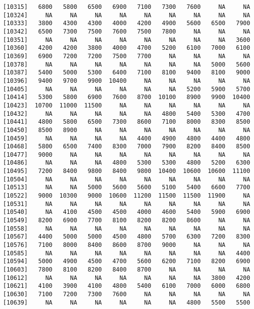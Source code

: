 \documentclass[]{article}
\begin{document}
\begin{verbatim}
[10315]   6800   5800   6500   6900   7100   7300   7600     NA     NA
[10324]     NA     NA     NA     NA     NA     NA     NA     NA     NA
[10333]   3800   4300   4300   4000   4200   4900   5600   6500   7900
[10342]   6500   7300   7500   7600   7500   7800     NA     NA     NA
[10351]     NA     NA     NA     NA     NA     NA     NA     NA   3600
[10360]   4200   4200   3800   4000   4700   5200   6100   7000   6100
[10369]   6900   7200   7200   7500   7700     NA     NA     NA     NA
[10378]     NA     NA     NA     NA     NA     NA     NA   5000   5600
[10387]   5400   5000   5300   6400   7100   8100   9400   8100   9000
[10396]   9400   9700   9900  10400     NA     NA     NA     NA     NA
[10405]     NA     NA     NA     NA     NA     NA   5200   5900   5700
[10414]   5300   5800   6900   7600   8700  10100   8900   9900  10400
[10423]  10700  11000  11500     NA     NA     NA     NA     NA     NA
[10432]     NA     NA     NA     NA     NA   4800   5400   5300   4700
[10441]   4800   5800   6500   7300   8600   7100   8000   8300   8500
[10450]   8500   8900     NA     NA     NA     NA     NA     NA     NA
[10459]     NA     NA     NA     NA   4400   4900   4800   4400   4800
[10468]   5800   6500   7400   8300   7000   7900   8200   8400   8500
[10477]   9000     NA     NA     NA     NA     NA     NA     NA     NA
[10486]     NA     NA     NA   4800   5300   5300   4800   5200   6300
[10495]   7200   8400   9800   8400   9800  10400  10600  10600  11100
[10504]     NA     NA     NA     NA     NA     NA     NA     NA     NA
[10513]     NA     NA   5000   5600   5600   5100   5400   6600   7700
[10522]   9000  10300   9000  10600  11200  11500  11500  11900     NA
[10531]     NA     NA     NA     NA     NA     NA     NA     NA     NA
[10540]     NA   4100   4500   4500   4000   4600   5400   5900   6900
[10549]   8200   6900   7700   8100   8200   8200   8600     NA     NA
[10558]     NA     NA     NA     NA     NA     NA     NA     NA     NA
[10567]   4400   5000   5000   4500   4800   5700   6300   7200   8300
[10576]   7100   8000   8400   8600   8700   9000     NA     NA     NA
[10585]     NA     NA     NA     NA     NA     NA     NA     NA   4400
[10594]   5000   4900   4500   4700   5600   6200   7100   8200   6900
[10603]   7800   8100   8200   8400   8700     NA     NA     NA     NA
[10612]     NA     NA     NA     NA     NA     NA     NA   3800   4200
[10621]   4100   3900   4100   4800   5400   6100   7000   6000   6800
[10630]   7100   7200   7300   7600     NA     NA     NA     NA     NA
[10639]     NA     NA     NA     NA     NA     NA   4800   5500   5500

\end{verbatim}
\end{document}
